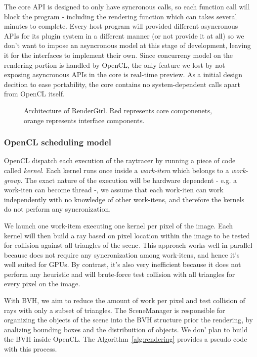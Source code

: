 \documentclass[a4paper]{sbgames}               %
\begin{document}
The core API is designed to only have syncronous calls, so each
function call will block the program - including the rendering
function which can takes several minutes to complete. Every host
program will provided different asyncronous APIs for its plugin system
in a different manner (or not provide it at all) so we don't want to
impose an asyncronous model at this stage of development, leaving it
for the interfaces to implement their own. Since concurreny model on
the rendering portion is handled by OpenCL, the only feature we lost
by not exposing asyncronous APIs in the core is real-time preview. As
a initial design decition to ease portability, the core contains no
system-dependent calls apart from OpenCL itself.

\begin{figure}
\centering

\caption{Architecture of RenderGirl. Red represents core componenets,
  orange represents interface components.}
\label{fig:architecture}
\end{figure}

\subsubsection{OpenCL scheduling model}

OpenCL dispatch each execution of the raytracer by running a piece of
code called \emph{kernel}. Each kernel runs once inside a
\emph{work-item} which belongs to a \emph{work-group}. The exact
nature of the execution will be hardware dependent - e.g. a work-iten
can become thread -, we assume that each work-iten can work
independently with no knowledge of other work-itens, and therefore the
kernels do not perform any syncronization.

We launch one work-item executing one kernel per pixel of the
image. Each kernel will then build a ray based on pixel location
within the image to be tested for collision against all triangles of
the scene. This approach works well in parallel because does not
require any syncronization among work-itens, and hence it's well
suited for GPUs. By contrast, it's also very inefficient because it
does not perform any heuristic and will brute-force test collision
with all triangles for every pixel on the image.

With BVH, we aim to reduce the amount of work per pixel and test
collision of rays with only a subset of triangles. The SceneManager is
responsible for organizing the objects of the scene into the BVH
structure prior the rendering, by analizing bounding boxes and the
distribuition of objects. We don' plan to build the BVH inside
OpenCL. The Algorithm~\ref{alg:rendering} provides a pseudo code
with this process.
\end{document}
